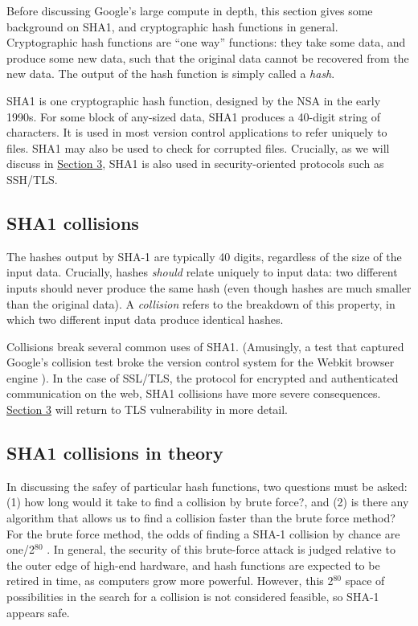 \documentclass[sigconf]{acmart}
\begin{document}
Before discussing Google's large compute in depth,
this section gives some background on SHA1, and cryptographic hash functions in general.
Cryptographic hash functions are ``one way'' functions: 
they take some data, and produce some new data, such that the original data cannot be recovered from the new data. The output of the hash function is simply called a \emph{hash}.

SHA1 is one cryptographic hash function, designed by the NSA in the early 1990s.
For some block of any-sized data, SHA1 produces a 40-digit string of characters.
It is used in most version control applications to refer uniquely to files. SHA1 may also be used to check for corrupted files. 
Crucially, as we will discuss in \uline{Section 3}, SHA1 is also used in security-oriented protocols such as SSH/TLS.


\subsection{SHA1 collisions}
\label{sec:orgfedc6cd}

The hashes output by SHA-1 are typically 40 digits, regardless of the size of the input data.
Crucially, hashes \emph{should} relate uniquely to input data: 
two different inputs should never produce the same hash (even though hashes are much smaller than the original data).
A \emph{collision} refers to the breakdown of this property,
in which two different input data produce identical hashes.

Collisions break several common uses of SHA1. 
(Amusingly, a test that captured Google's collision test broke the version control system for the Webkit browser engine \cite{Koivisto2017}).
In the case of SSL/TLS, the protocol for encrypted and authenticated communication on the web, SHA1 collisions have more severe consequences.
\uline{Section 3} will return to TLS vulnerability in more detail.

\subsection{SHA1 collisions in theory}
\label{sec:org2fb5feb}

In discussing the safey of particular hash functions, two questions must be asked:
(1) how long would it take to find a collision by brute force?, and 
(2) is there any algorithm that allows us to find a collision faster than the brute force method?
For the brute force method, the odds of finding a SHA-1 collision by chance are one/2\(^{\text{80}}\)
\cite{Schneier2005}.
In general, the security of this brute-force attack is judged relative to the outer edge of high-end hardware, and hash functions are expected to be retired in time, as computers grow more powerful.
However, this 2\(^{\text{80}}\) space of possibilities in the search for a collision is not considered feasible, so SHA-1 appears safe.
\end{document}
